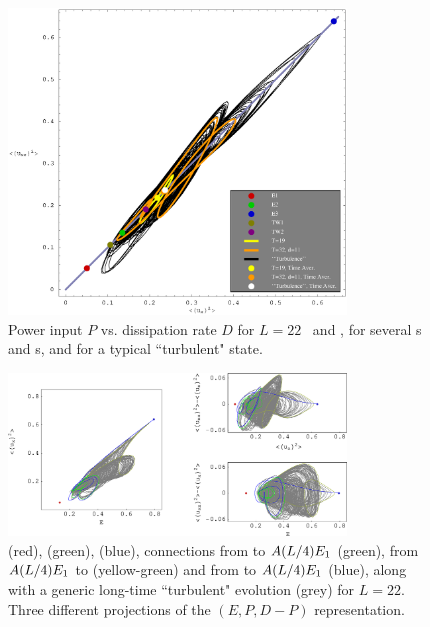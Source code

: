 \begin{figure}[t] 
\begin{center}
    \includegraphics[width=0.8\textwidth]{figs/energyBalancePlot.eps}
\end{center}
\caption{
Power input $P$ vs.
dissipation rate $D$ for $L=22$ \eqva\
and \reqva, for several
\po s and \rpo s, and for a typical ``turbulent" state.
        }
\label{f:drivedrag}
\end{figure}

\begin{figure}[t] 
\begin{center}
    \includegraphics[width=0.8\textwidth]{figs/ks22TurbConn_xfig.eps}
\end{center}
\caption{
 (red),  (green),  (blue), 
connections from  to $A(L/4)E_{1}$ (green),
from $A(L/4)E_{1}$ to \EQV{1} (yellow-green) 
and from  to $A(L/4)E_{1}$ (blue), along
with a generic long-time ``turbulent" evolution (grey) for $L=22$. 
Three different projections of the 
$(E,P,D-P)$
representation.
        }
\label{f:drivedragConn}
\end{figure}

